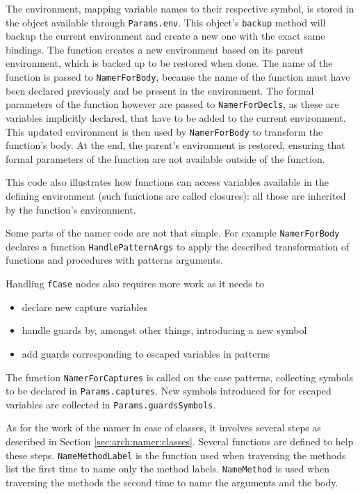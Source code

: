 \documentclass[a4paper]{memoir}
\begin{document}
The environment, mapping variable names to their respective symbol, is stored in
the object available through \lstinline!Params.env!. This object's
\lstinline!backup! method will backup the current environment and create a new
one with the exact same bindings.
The function creates a new environment based on its parent environment, which is
backed up to be restored when done. The name of the function is passed to \lstinline!NamerForBody!, because the name of the function must have been declared previously and be present in the environment. 
The formal parameters of the function however are passed to \lstinline!NamerForDecls!, as these are variables implicitly declared, that have to be added to the current environment. This updated environment is then used by \lstinline!NamerForBody! to transform the function's body.
At the end, the parent's environment is restored, ensuring that formal parameters of the function are not available outside of the function.

This code also illustrates how functions can access variables
available in the defining environment (such functions are called closures): all
those are inherited by the function's environment.

Some parts of the namer code are not that simple. For example \lstinline!NamerForBody! 
declares a function \lstinline!HandlePatternArgs!
to apply the described transformation of functions and procedures with patterns
arguments. 

Handling \lstinline!fCase! nodes also requires more work as it needs to 
\nopagebreak[4]
\begin{itemize}
  \item declare new capture variables
  \item handle guards by, amongst other things, introducing a new symbol
  \item add guards corresponding to escaped variables in patterns
\end{itemize}
The function \lstinline!NamerForCaptures! is called on the case patterns, collecting symbols
to be declared in \lstinline!Params.captures!.
New symbols introduced for for escaped variables are collected in
\lstinline!Params.guardsSymbols!. 

As for the work of the namer in case of classes, it involves several steps as described
in Section \ref{sec:arch:namer:classes}.
Several functions are defined to help these steps. \lstinline!NameMethodLabel!
is the function used when traversing the methods list the first time to name
only the method labels.
\lstinline!NameMethod! is used when traversing the methods the second time to
name the arguments and the body.
\end{document}
